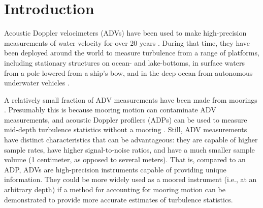 
\section{Introduction}

Acoustic Doppler velocimeters (ADVs) have been used to make high-precision measurements of water velocity for over 20 years \cite[]{Kraus++1994, Lohrmann++1995}.  During that time, they have been deployed around the world to measure turbulence from a range of platforms, including stationary structures on ocean- and lake-bottoms, in surface waters from a pole lowered from a ship's bow, and in the deep ocean from autonomous underwater vehicles \cite[e.g.,][]{Voulgaris+Trowbridge1998, Zhang++2001, Kim++2000, Goodman++2006, Lorke2007, Geyer++2008, Cartwright++2009}. 


A relatively small fraction of ADV measurements have been made from moorings \cite[e.g.,][]{Fer+Paskyabi2014}. Presumably this is because mooring motion can contaminate ADV measurements, and acoustic Doppler profilers (ADPs) can be used to measure mid-depth turbulence statistics without a mooring \cite[e.g.,][]{Stacey++1999a, Rippeth++2002, Wiles++2006}. Still, ADV measurements have distinct characteristics that can be advantageous: they are capable of higher sample rates, have higher signal-to-noise ratios, and have a much smaller sample volume (1 centimeter, as opposed to several meters). That is, compared to an ADP, ADVs are high-precision instruments capable of providing unique information. They could be more widely used as a moored instrument (i.e., at an arbitrary depth) if a method for accounting for mooring motion can be demonstrated to provide more accurate estimates of turbulence statistics.

